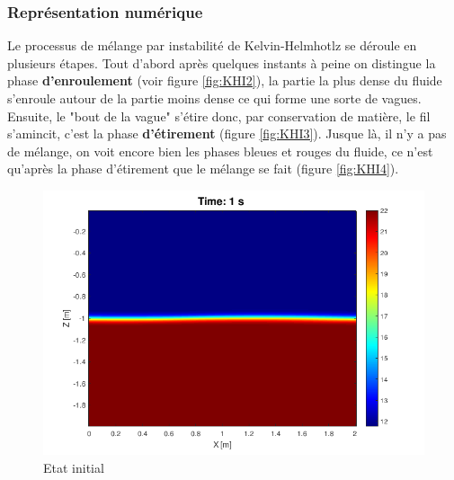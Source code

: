 \documentclass{rapportECC}
\begin{document}
\subsubsection{Représentation numérique}
Le processus de mélange par instabilité de Kelvin-Helmhotlz se déroule en plusieurs étapes. Tout d'abord après quelques instants à peine on distingue la phase \textbf{d'enroulement} (voir figure \ref{fig:KHI2}), la partie la plus dense du fluide s'enroule autour de la partie moins dense ce qui forme une sorte de vagues. Ensuite, le "bout de la vague" s'étire donc, par conservation de matière, le fil s'amincit, c'est la phase \textbf{d'étirement} (figure \ref{fig:KHI3}). Jusque là, il n'y a pas de mélange, on voit encore bien les phases bleues et rouges du fluide, ce n'est qu'après la phase d'étirement que le mélange se fait (figure \ref{fig:KHI4}).
\begin{figure}[htbp] %
    \centering
    \begin{minipage}{0.45\textwidth}
        \centering
        \includegraphics[width=\linewidth]{images/KHI1.png}
        \caption{Etat initial}
        \label{fig:KHI1}
    \end{minipage}
    \hspace{0.05\textwidth} %
    \begin{minipage}{0.45\textwidth}
        \centering

\end{minipage}
\end{figure}
\end{document}
